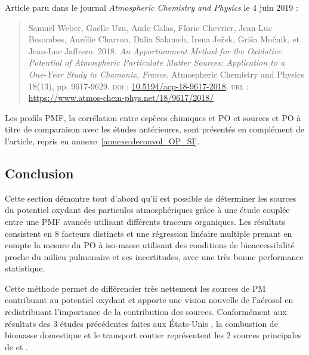 \begin{tcolorbox}[colback=red!5!white,colframe=Melon,title=Note]
Article paru dans le journal \textit{Atmospheric Chemistry and Physics} le 4 juin 2019 :

\begin{quote}
    Samuël Weber, Gaëlle Uzu, Aude Calas, Florie Chevrier, Jean-Luc Besombes,
    Aurélie Charron, Dalia Salameh, Irena Ježek, Griša Močnik, et Jean-Luc Jaffrezo. 2018.
    \textit{An Apportionment Method for the Oxidative Potential of Atmospheric Particulate
    Matter Sources: Application to a One-Year Study in Chamonix, France}. Atmospheric
    Chemistry and Physics 18(13), pp. 9617‑9629.
    \textsc{doi} : \href{https://doi.org/10.5194/acp-18-9617-2018}{10.5194/acp-18-9617-2018},
    \textsc{url} : \url{https://www.atmos-chem-phys.net/18/9617/2018/}
\end{quote}

Les profils PMF, la corrélation entre espèces chimiques et PO et sources et
PO à titre de comparaison avec les études antérieures, sont présentés en complément de
l'article, repris en annexe~\ref{annexe:deconvol_OP_SI}.
\end{tcolorbox}

\clearpage


\subsection{Conclusion}

Cette section démontre tout d'abord qu'il est possible de déterminer les sources du potentiel oxydant des particules atmosphériques grâce à 
une étude couplée entre une PMF avancée utilisant différents traceurs organiques. Les résultats consistent en 8 facteurs distincts et une régression linéaire multiple prenant en compte
la mesure du PO à iso-masse utilisant des conditions de bioaccessibilité proche du milieu
pulmonaire et ses incertitudes, avec une très bonne performance statistique.

Cette méthode permet de différencier très nettement les sources de PM contribuant au potentiel oxydant et apporte une vision nouvelle de l'aérosol en redistribuant l'importance de la contribution
des sources. Conformément aux résultats des 3 études précédentes faites aux États-Unis
\autocite{vermaReactive2014,batesReactive2015,fangOxidative2016}, la combustion de
biomasse domestique et le transport routier représentent les 2 sources principales de
\POAAv{} et \PODTTv.

